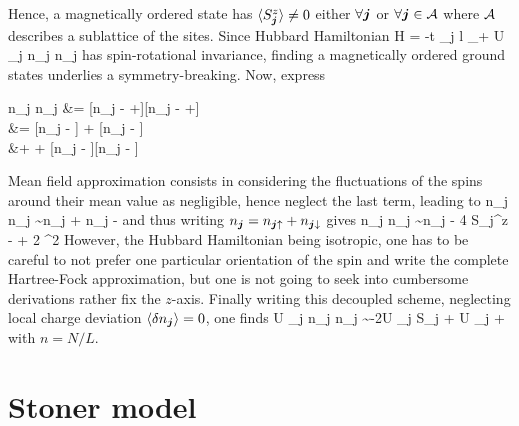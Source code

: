 		Hence, a magnetically ordered state has $\langle S_{\vb* j}^z \rangle \neq0$ either $\forall \vb* j$ or $\forall \vb* j \in \mathcal A$ where $\mathcal A$ describes a sublattice of the sites. Since Hubbard Hamiltonian
		\be \mc H = -t \sum_{\langle \vb* j \vb* l \rangle} \sum_ + U \sum_{\vb* j} n_{\vb* j \uparrow} n_{\vb* j \downarrow} \ee 
		has spin-rotational invariance, finding a magnetically ordered ground states underlies a symmetry-breaking. Now, express
		\be \begin{split} n_{\vb* j \uparrow}n_{\vb* j \downarrow} &= [n_{\vb* j \uparrow} - +][n_{\vb* j \downarrow} - +] \\ &= [n_{\vb* j \uparrow} - ] + [n_{\vb* j \downarrow} - ] \\ &+  + [n_{\vb* j \uparrow} - ][n_{\vb* j \downarrow} - ] \end{split} \ee
		Mean field approximation consists in considering the fluctuations of the spins around their mean value as negligible, hence neglect the last term, leading to
		\be n_{\vb* j \uparrow}n_{\vb* j \downarrow} \sim n_{\vb* j \uparrow} + n_{\vb* j \downarrow} -  \label{eq:decoupling} \ee
		and thus writing $n_{\vb* j} = n_{\vb* j \uparrow} + n_{\vb* j \downarrow}$ gives
		 n_{\vb* j \uparrow}n_{\vb* j \downarrow} \sim n_{\vb* j} - 4 S_{\vb* j}^z  -  + 2 ^2  \ee
		However, the Hubbard Hamiltonian being isotropic, one has to be careful to not prefer one particular orientation of the spin and write the complete Hartree-Fock approximation, but one is not going to seek into cumbersome derivations rather fix the $z$-axis. Finally writing this decoupled scheme, neglecting local charge deviation $\ev{\delta n_{\vb* j}} = 0$, one finds
		\be U \sum_{\vb* j} n_{\vb* j \uparrow} n_{\vb* j \downarrow} \sim -2U \sum_{\vb* j} \vb* S_{\vb* j}  +  U \sum_{\vb* j}  +  \ee
		with $n = N/L$.

	\section{Stoner model}

